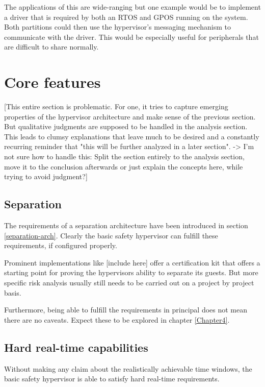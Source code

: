 The applications of this are wide-ranging but one example would be to implement a driver that is required by both an \gls{RTOS} and \gls{GPOS} running on the system. Both partitions could then use the hypervisor's messaging mechanism to communicate with the driver. This would be especially useful for peripherals that are difficult to share normally.


\section{Core features}
[This entire section is problematic. For one, it tries to capture emerging properties of the hypervisor architecture and make sense of the previous section. But qualitative judgments are supposed to be handled in the analysis section. This leads to clumsy explanations that leave much to be desired and a constantly recurring reminder that "this will be further analyzed in a later section". -> I'm not sure how to handle this: Split the section entirely to the analysis section, move it to the conclusion afterwards or just explain the concepts here, while trying to avoid judgment?]
\subsection{Separation}
The requirements of a separation architecture have been introduced in section \ref{separation-arch}. Clearly the basic safety hypervisor can fulfill these requirements, if configured properly. 

Prominent implementations like [include here] offer a certification kit that offers a starting point for proving the hypervisors ability to separate its guests. But more specific risk analysis usually still needs to be carried out on a project by project basis.

Furthermore, being able to fulfill the requirements in principal does not mean there are no caveats. Expect these to be explored in chapter \ref{Chapter4}.
\subsection{Hard real-time capabilities}
Without making any claim about the realistically achievable time windows, the basic safety hypervisor is able to satisfy hard real-time requirements. 
